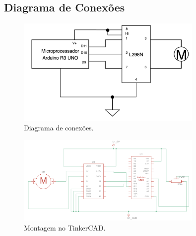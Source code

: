\documentclass[12pt, a4paper]{article}
\begin{document}
\subsection{Diagrama de Conexões}
\begin{figure}[H]
	\centering
	\includegraphics[width=0.8\textwidth]{./images/diagrama_aula05.png}
	\caption{Diagrama de conexões.}
	\label{fig:montagem_protoboard}
\end{figure}
\begin{figure}[H]
	\centering
	\includegraphics[width=0.8\textwidth]{./images/diagrama_tinkercad_aula05.png}
	\caption{Montagem no TinkerCAD.}
	\label{fig:montagem_protoboard}
\end{figure}
\end{document}
